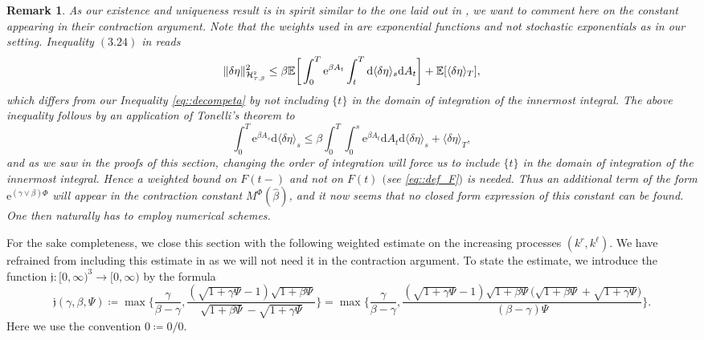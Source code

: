 \documentclass[10pt]{article} %
\newtheorem{remark}[theorem]{Remark}
\newcommand\cH{\mathcal H}
\newcommand{\smalltext}[1]{\text{\fontsize{4}{4}\selectfont$#1$}}
\def \E{\mathbb{E}}
\newcommand{\1}{\mathbf{1}}
\def\d{\mathrm{d}}
\begin{document}
\begin{remark}\label{rem::discussion_constants}
	As our existence and uniqueness result is in spirit similar to the one laid out in {\rm\cite{papapantoleon2018existence}}, we want to comment here on the constant appearing in their contraction argument. Note that the weights used in {\rm\cite{papapantoleon2018existence}} are exponential functions and not stochastic exponentials as in our setting. {\rm Inequality $(3.24)$} in {\rm\cite{papapantoleon2018existence}} reads
	\begin{equation*}
		\|\delta\eta\|^2_{\cH^\smalltext{2}_{\smalltext{T}\smalltext{,}\beta}} \leq \beta \E \bigg[ \int_0^T \mathrm{e}^{\beta A_t} \int_{t}^T \d \langle \delta\eta \rangle_s \d A_t \bigg] + \E [ \langle \delta\eta \rangle_T ],
	\end{equation*}
	which differs from our {\rm Inequality \eqref{eq::decompeta}} by not including $\{t\}$ in the domain of integration of the innermost integral. The above inequality follows by an application of Tonelli's theorem to
	\begin{equation*}
		\int_0^T \mathrm{e}^{\beta A_s} \d \langle \delta\eta \rangle_s 
		\leq \beta \int_0^T\int_0^s \mathrm{e}^{\beta A_t} \d A_t \d \langle \delta\eta \rangle_s + \langle \delta\eta \rangle_T,
	\end{equation*} 
	and as we saw in the proofs of this section, changing the order of integration will force us to include $\{t\}$ in the domain of integration of the innermost integral. Hence a weighted bound on $F(t-)$ and not on $F(t)$ $($see \eqref{eq::def_F}$)$ is needed. Thus an additional term of the form $\mathrm{e}^{(\gamma\lor\beta)\Phi}$ will appear in the contraction constant $M^\Phi(\hat\beta)$, and it now seems that no closed form expression of this constant can be found. One then naturally has to employ numerical schemes.
\end{remark}

For the sake completeness, we close this section with the following weighted estimate on the increasing processes $(k^r,k^\ell)$. We have refrained from including this estimate in  as we will not need it in the contraction argument. To state the estimate, we introduce the function $\mathfrak{j} : [0,\infty)^3 \longrightarrow [0,\infty)$ by the formula
\begin{equation*}
	\mathfrak{j}(\gamma,\beta,\Psi) \coloneqq \max\Bigg\{\frac{\gamma}{\beta-\gamma}, \frac{(\sqrt{1+\gamma \Psi} - 1)\sqrt{1+\beta \Psi}}{\sqrt{1+\beta \Psi} - \sqrt{1+\gamma \Psi}}\Bigg\} = \max\Bigg\{\frac{\gamma}{\beta-\gamma}, \frac{(\sqrt{1+\gamma \Psi} - 1)\sqrt{1+\beta \Psi}\big(\sqrt{1+\beta \Psi}+\sqrt{1+\gamma \Psi}\big)}{(\beta-\gamma)\Psi}\Bigg\}.
\end{equation*}
Here we use the convention $0 \coloneqq 0/0$. 
\end{document}
